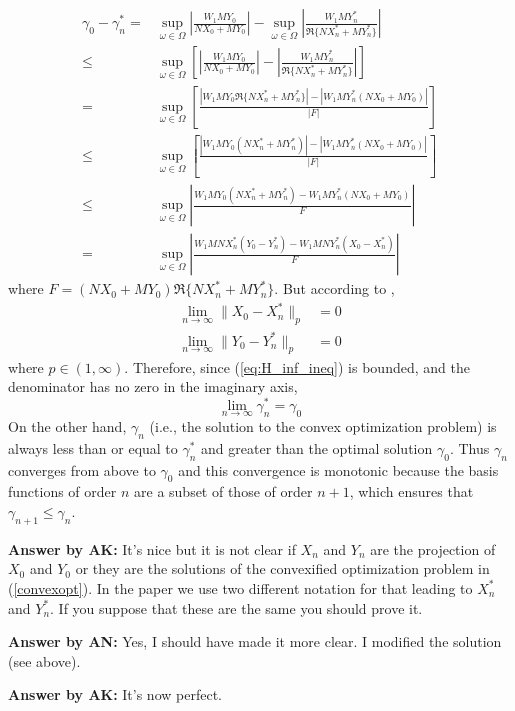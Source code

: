 \documentclass[12pt]{article}
\begin{document}
\begin{equation} \label{eq:H_inf_ineq}
\begin{aligned}
\gamma_0-\gamma_n^*  =& \sup_{\omega \in \Omega} \left \lvert \frac{W_1MY_0}{ NX_0 + MY_0} \right \rvert  - \sup_{\omega \in \Omega} \left \lvert \frac{W_1MY_n^*}{\Re\{ NX_n^* + MY_n^*\}} \right \rvert  \\
\leq & \sup_{\omega \in \Omega} \left[ \left \lvert \frac{W_1MY_0}{ NX_0 + MY_0} \right \rvert  - \left \lvert \frac{W_1MY_n^*}{\Re\{ NX_n^* + MY_n^*\}} \right \rvert \right] \\
 =&   \sup_{\omega \in \Omega} \left[ \frac{|W_1MY_0 \Re\{ NX_n^*+MY_n^*\}| - |W_1MY_n^*(NX_0+MY_0)| }{|F|} \right] \\
 \leq & \sup_{\omega \in \Omega} \left[ \frac{|W_1MY_0 (NX_n^*+MY_n^*)| - |W_1MY_n^*(NX_0+MY_0)| }{|F|} \right]  \\
  \leq & \sup_{\omega \in \Omega} \left \lvert \frac{W_1MY_0 (NX_n^*+MY_n^*) - W_1MY_n^*(NX_0+MY_0) }{F} \right \rvert \\
  = & \sup_{\omega \in \Omega} \left \lvert \frac{W_1MNX_n^*(Y_0-Y_n^*) - W_1MNY_n^*(X_0-X_n^*) }{F} \right \rvert 
\end{aligned}
\end{equation}
where $F = (NX_0+MY_0) \Re\{ NX_n^*+MY_n^*\}$. But according to \cite{AN99b},
\begin{equation} 
\begin{aligned}
\lim_{n \to \infty} \|X_0 - X_n^* \|_p &=0\\
\lim_{n \to \infty} \|Y_0 - Y_n^* \|_p &=0
 \end{aligned}
\end{equation}
where $p \in (1,\infty)$. Therefore, since (\ref{eq:H_inf_ineq}) is bounded, and the denominator has no zero in the imaginary axis,
\begin{equation}
\lim_{n\to\infty} \gamma_n^* = \gamma_0
\end{equation} 
On the other hand, $\gamma_n$ (i.e., the solution to the convex optimization problem) is always less than or equal to $\gamma_n^*$ and greater than the optimal solution $\gamma_0$. Thus $\gamma_n$ converges from above to $\gamma_0$ and this convergence is monotonic because the basis functions of order $n$ are a subset of those of order $n + 1$, which ensures that $\gamma_{n+1} \leq \gamma_n$.

{\bf Answer by AK:} It's nice but it is not clear if $X_n$ and $Y_n$ are the projection of $X_0$ and $Y_0$ or they are the solutions of the convexified optimization problem in (\ref{convexopt}). In the paper we use two different notation for that leading to $X^*_n$ and $Y_n^*$. If you suppose that these are the same you should prove it. 

{\bf Answer by AN:} Yes, I should have made it more clear. I modified the solution (see above).  

{\bf Answer by AK:} It's now perfect.

\end{document}
